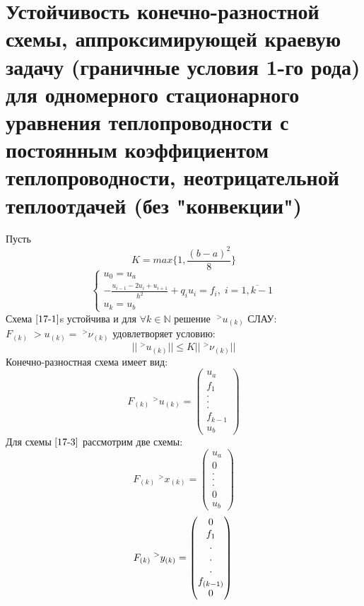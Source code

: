 \documentclass[__main__.tex]{subfiles}
\begin{document}
\section{Устойчивость конечно-разностной схемы, аппроксимирующей краевую задачу (граничные условия 1-го рода) для одномерного стационарного уравнения теплопроводности с постоянным коэффициентом теплопроводности, неотрицательной теплоотдачей (без "конвекции")}

Пусть 
\begin{equation*}
	K = max\{1,\frac{(b-a)^2}{8}\}
\end{equation*}
\begin{equation}
\begin{cases}
u_0 = u_a\\
-\frac{u_{i-1}-2u_i + u_{i+1}}{h^2} + q_iu_i = f_i, \; i=\overline{1, k-1}\\
u_k=u_b
\end{cases}
\label{17-1}
\end{equation}
Схема $\ref{17-1}$s устойчива и для $\forall k \in \mathbb{N}$ решение $\;^>u_{(k)}$ СЛАУ: $F_{(k)}\;>u_{(k)} = \;^>\nu_{(k)}$ удовлетворяет условию:
\begin{equation}
	||\;^>u_{(k)}|| \le K ||\;^>\nu_{(k)}||
	\label{17-2}
\end{equation}
Конечно-разностная схема имеет вид:
\begin{equation}
	F_{(k)}\;^>u_{(k)} =
	\begin{pmatrix}
		u_a\\
		f_1\\
		.\\
		.\\
		.\\
		f_{k-1}\\
		u_b
	\end{pmatrix}
	\label{17-3}
\end{equation}
Для схемы $\ref{17-3}$ рассмотрим две схемы:
\begin{equation}
	F_{(k)}\;^>x_{(k)} =
	\begin{pmatrix}
		u_a\\
		0\\
		.\\
		.\\
		.\\
		0\\
		u_b
	\end{pmatrix}
	\label{17-4}
\end{equation}
\begin{equation}
	F_{(k)}\;^>y_{(k)} =
	\begin{pmatrix}
		0\\
		f_1\\
		.\\
		.\\
		.\\
		f_{(k-1)}\\
		0
	\end{pmatrix}\\
	\label{17-5}
\end{equation}
\end{document}
